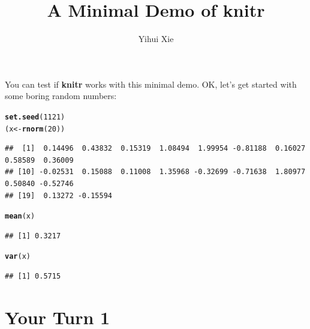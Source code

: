 \documentclass{article}\usepackage[]{graphicx}\usepackage[]{color}
\makeatletter
\newcommand{\hlnum}[1]{\textcolor[rgb]{0.686,0.059,0.569}{#1}}%
\newcommand{\hlstd}[1]{\textcolor[rgb]{0.345,0.345,0.345}{#1}}%
\newcommand{\hlkwb}[1]{\textcolor[rgb]{0.69,0.353,0.396}{#1}}%
\newcommand{\hlkwd}[1]{\textcolor[rgb]{0.737,0.353,0.396}{\textbf{#1}}}%
\newenvironment{kframe}{%
 \def\at@end@of@kframe{}%
 \ifinner\ifhmode%
  \def\at@end@of@kframe{\end{minipage}}%
  \begin{minipage}{\columnwidth}%
 \fi\fi%
 \def\FrameCommand##1{\hskip\@totalleftmargin \hskip-\fboxsep
 \colorbox{shadecolor}{##1}\hskip-\fboxsep
     \hskip-\linewidth \hskip-\@totalleftmargin \hskip\columnwidth}%
 \MakeFramed {\advance\hsize-\width
   \@totalleftmargin\z@ \linewidth\hsize
   \@setminipage}}%
 {\par\unskip\endMakeFramed%
 \at@end@of@kframe}
\newenvironment{knitrout}{}{} %
\makeatother
\begin{document}
\title{A Minimal Demo of knitr}


\author{Yihui Xie}

\maketitle
You can test if \textbf{knitr} works with this minimal demo. OK, let's
get started with some boring random numbers:

\begin{knitrout}
\color{fgcolor}\begin{kframe}
\begin{alltt}
\hlkwd{set.seed}\hlstd{(}\hlnum{1121}\hlstd{)}
\hlstd{(x} \hlkwb{<-} \hlkwd{rnorm}\hlstd{(}\hlnum{20}\hlstd{))}
\end{alltt}
\begin{verbatim}
##  [1]  0.14496  0.43832  0.15319  1.08494  1.99954 -0.81188  0.16027  0.58589  0.36009
## [10] -0.02531  0.15088  0.11008  1.35968 -0.32699 -0.71638  1.80977  0.50840 -0.52746
## [19]  0.13272 -0.15594
\end{verbatim}
\begin{alltt}
\hlkwd{mean}\hlstd{(x)}
\end{alltt}
\begin{verbatim}
## [1] 0.3217
\end{verbatim}
\begin{alltt}
\hlkwd{var}\hlstd{(x)}
\end{alltt}
\begin{verbatim}
## [1] 0.5715
\end{verbatim}
\end{kframe}
\end{knitrout}


\clearpage
\section{Your Turn 1}
\end{document}
